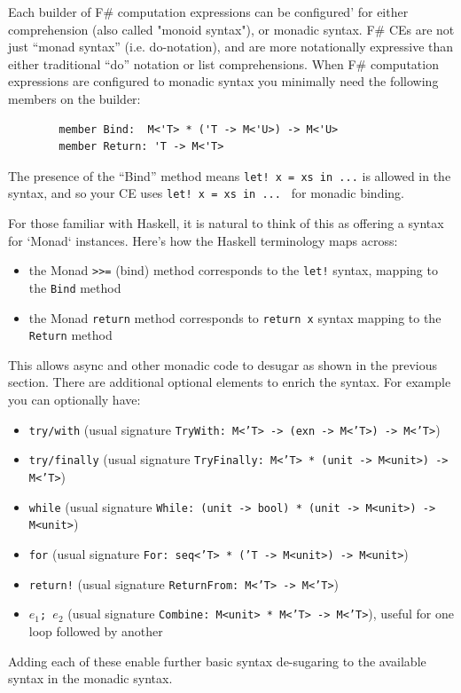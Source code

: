 \documentclass[acmsmall]{acmart}\settopmatter{}
\begin{document}
Each builder of F\# computation expressions can be configured' for either comprehension (also called "monoid syntax"), or monadic syntax. 
F\# CEs are not just ``monad syntax'' (i.e. do-notation), and are more notationally expressive than
either traditional ``do'' notation or list comprehensions.
When F\# computation expressions are configured to monadic syntax you minimally need the following members on the builder:
\begin{verbatim}
        member Bind:  M<'T> * ('T -> M<'U>) -> M<'U>
        member Return: 'T -> M<'T>
\end{verbatim}
The presence of the ``Bind'' method means \texttt{let! x = xs in  ...} is allowed in the syntax, and so your CE uses \texttt{let! x = xs in  ... } for monadic binding. 

For those familiar with Haskell, it is natural to think of this as offering a syntax for `Monad`
instances.  Here’s how the Haskell terminology maps across:
\begin{itemize}
\item the Monad \texttt{>>=} (bind) method corresponds to the \texttt{let!} syntax, mapping to the \texttt{Bind} method
\item the Monad \texttt{return} method corresponds to \texttt{return x} syntax mapping to the \texttt{Return} method
\end{itemize}
This allows async and other monadic code to desugar as shown in the previous section. There are additional optional elements to enrich the syntax. For example you can optionally have:
\begin{itemize}
\item \texttt{try/with} (usual signature \texttt{TryWith: M<'T> -> (exn -> M<'T>) -> M<'T>})
\item \texttt{try/finally}  (usual signature \texttt{TryFinally: M<'T> * (unit -> M<unit>) -> M<'T>})
\item \texttt{while} (usual signature \texttt{While: (unit -> bool) * (unit -> M<unit>) -> M<unit>})
\item \texttt{for} (usual signature \texttt{For: seq<'T> * ('T -> M<unit>) -> M<unit>})
\item \texttt{return!} (usual signature \texttt{ReturnFrom: M<'T> -> M<'T>})
\item \texttt{$e_1$; $e_2$} (usual signature \texttt{Combine: M<unit> * M<'T> -> M<'T>}), useful for one loop followed by another 
\end{itemize}
Adding each of these enable further basic syntax de-sugaring to the available syntax in the monadic syntax.
\end{document}

